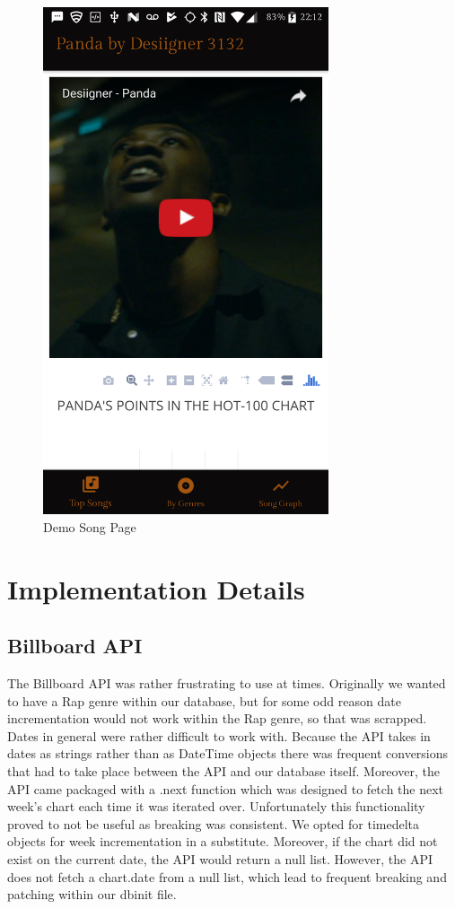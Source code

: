 \documentclass{article}
\begin{document}
\begin{figure}[H]
\begin{minipage}{.5\textwidth}
    \includegraphics[width=0.75\textwidth]{Video.png}
    \caption{Demo Song Page}
    \label{fig:ER}
  \end{minipage}
\end{figure}


\section*{Implementation Details}
\subsection*{Billboard API}
The Billboard API was rather frustrating to use at times.
Originally we wanted to have a Rap genre within our database, but for some odd reason date incrementation would not work within the Rap genre, so that was scrapped.
Dates in general were rather difficult to work with.
Because the API takes in dates as strings rather than as DateTime objects there was frequent conversions that had to take place between the API and our database itself.
Moreover, the API came packaged with a .next function which was designed to fetch the next week's chart each time it was iterated over.
Unfortunately this functionality proved to not be useful as breaking was consistent.
We opted for timedelta objects for week incrementation in a substitute. 
Moreover, if the chart did not exist on the current date, the API would return a null list.
However, the API does not fetch a chart.date from a null list, which lead to frequent breaking and patching within our dbinit file. 
\end{document}
